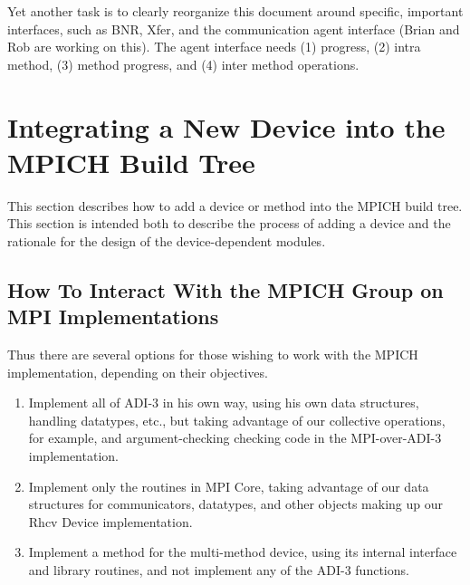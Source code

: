\documentclass{article}
\begin{document}
Yet another task is to clearly reorganize this document around
specific, important interfaces, such as BNR, Xfer, and the
communication agent interface (Brian and Rob are working on this).
The agent interface needs (1) progress, (2) intra method, (3) method
progress, and (4) inter method operations.


%

%


\section{Integrating a New Device into the MPICH Build Tree}
This section describes how to add a device or method into the MPICH
build tree.  This section is intended both to describe the process of
adding a device and the rationale for the design of the
device-dependent modules.

\subsection{How To Interact With the MPICH Group on MPI Implementations}
\label{sec:collaborators}

Thus there are several options for those wishing to work with the
MPICH implementation, depending on their objectives.
\begin{enumerate}
\item Implement all of ADI-3 in his own way, using his
  own data structures, handling datatypes, etc., but taking advantage of our
  collective operations, for example, and argument-checking checking code in
  the MPI-over-ADI-3 implementation.
\item Implement only the routines in MPI Core, taking
  advantage of our data structures for communicators, datatypes, and other
  objects making up our Rhcv Device implementation.
\item Implement a method for the multi-method device, using its internal
  interface and library routines, and not implement any of the ADI-3 functions.
\end{enumerate}
\end{document}

